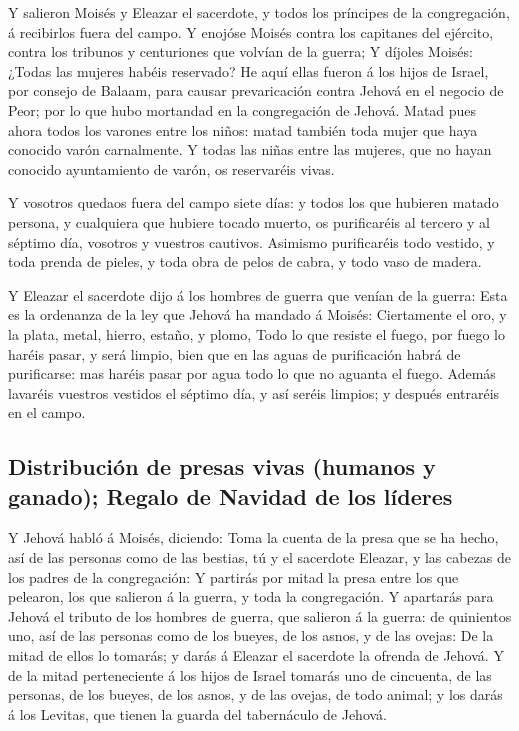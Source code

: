  Y salieron Moisés y Eleazar el sacerdote, y todos los
príncipes de la congregación, á recibirlos fuera del campo.
 Y enojóse Moisés contra los capitanes del ejército, contra
los tribunos y centuriones que volvían de la guerra;  Y
díjoles Moisés: ¿Todas las mujeres habéis reservado?  He
aquí ellas fueron á los hijos de Israel, por consejo de Balaam, para
causar prevaricación contra Jehová en el negocio de Peor; por lo que
hubo mortandad en la congregación de Jehová.  Matad pues
ahora todos los varones entre los niños: matad también toda mujer que
haya conocido varón carnalmente.  Y todas las niñas entre
las mujeres, que no hayan conocido ayuntamiento de varón, os reservaréis
vivas.

 Y vosotros quedaos fuera del campo siete días: y todos los
que hubieren matado persona, y cualquiera que hubiere tocado muerto, os
purificaréis al tercero y al séptimo día, vosotros y vuestros cautivos.
 Asimismo purificaréis todo vestido, y toda prenda de
pieles, y toda obra de pelos de cabra, y todo vaso de madera.

 Y Eleazar el sacerdote dijo á los hombres de guerra que
venían de la guerra: Esta es la ordenanza de la ley que Jehová ha
mandado á Moisés:  Ciertamente el oro, y la plata, metal,
hierro, estaño, y plomo,  Todo lo que resiste el fuego, por
fuego lo haréis pasar, y será limpio, bien que en las aguas de
purificación habrá de purificarse: mas haréis pasar por agua todo lo que
no aguanta el fuego.  Además lavaréis vuestros vestidos el
séptimo día, y así seréis limpios; y después entraréis en el campo.

\hypertarget{distribuciuxf3n-de-presas-vivas-humanos-y-ganado-regalo-de-navidad-de-los-luxedderes}{%
\subsection{Distribución de presas vivas (humanos y ganado); Regalo de
Navidad de los
líderes}\label{distribuciuxf3n-de-presas-vivas-humanos-y-ganado-regalo-de-navidad-de-los-luxedderes}}

 Y Jehová habló á Moisés, diciendo:  Toma la
cuenta de la presa que se ha hecho, así de las personas como de las
bestias, tú y el sacerdote Eleazar, y las cabezas de los padres de la
congregación:  Y partirás por mitad la presa entre los que
pelearon, los que salieron á la guerra, y toda la congregación.
 Y apartarás para Jehová el tributo de los hombres de
guerra, que salieron á la guerra: de quinientos uno, así de las personas
como de los bueyes, de los asnos, y de las ovejas:  De la
mitad de ellos lo tomarás; y darás á Eleazar el sacerdote la ofrenda de
Jehová.  Y de la mitad perteneciente á los hijos de Israel
tomarás uno de cincuenta, de las personas, de los bueyes, de los asnos,
y de las ovejas, de todo animal; y los darás á los Levitas, que tienen
la guarda del tabernáculo de Jehová.

